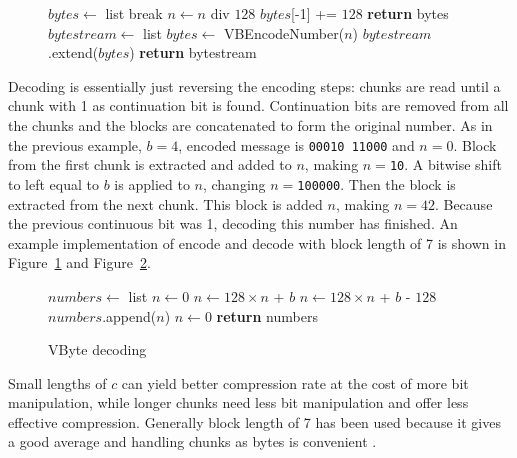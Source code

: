 \begin{figure}[ht]
\centering
  \begin{minipage}{.7\linewidth}
\begin{algorithmic}[H]
\State $bytes\gets $ list
\State {}
 \State break \EndIf
\State $n\gets n$ div $128$
\EndWhile
\State $bytes$[-1] += $128$
\State \textbf{return} bytes
\EndFunction
\medskip
\medskip
{}
\State $bytestream\gets $ list
\State $bytes \gets$ VBEncodeNumber($n$)
\State $bytestream$.extend($bytes$)
\EndFor
\State \textbf{return} bytestream
\EndFunction

\end{algorithmic}
\end{minipage}
 \label{vbyte_enc}
\end{figure}

Decoding is essentially just reversing the encoding steps: chunks are read until a chunk with 1 as continuation bit is found. Continuation bits 
are removed from all the chunks and the blocks are concatenated to form the original number. As in the previous example, $b = 4$, encoded message 
is \texttt{00010 11000} and $n = 0$. Block from the first chunk is extracted and added to $n$, making $n = $\texttt{10}. A bitwise shift to left 
equal to $b$ is applied to $n$, changing $n = $\texttt{100000}. Then the block is extracted from the next chunk. This block is added  $n$, making 
$n = 42$. Because the previous continuous bit was 1, decoding this number has finished. An example implementation of encode and decode with block 
length of 7 is shown in Figure~\ref{vbyte_enc} and Figure~\ref{vbyte_dec}.

\begin{figure}[ht]
\begin{algorithmic}
\State $numbers\gets $ list
\State $n\gets 0$
\State $n\gets 128\times n $ + $b$
\Else
\State $n\gets 128\times n $ + $b$ - $128$
\State $numbers$.append($n$)
\State $n\gets 0$
\EndIf
\EndFor
\State \textbf{return} numbers
\EndFunction
\end{algorithmic}
\caption{VByte decoding} \label{vbyte_dec}
\end{figure}

Small lengths of $c$ can yield better compression rate at the cost of more bit manipulation, while longer chunks need less bit manipulation and 
offer less effective compression. Generally block length of 7 has been used because it gives a good average and handling chunks as bytes is 
convenient \citep{Man08}.

